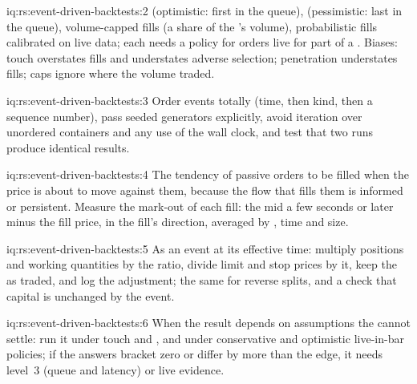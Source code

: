 \begin{solution}{iq:rs:event-driven-backtests:2}
 (optimistic: first in the queue),  (pessimistic: last in the queue), volume-capped fills (a share of the 's volume),
probabilistic fills calibrated on live data; each needs a policy for orders live for part of a . Biases: touch overstates fills and understates adverse
selection; penetration understates fills; caps ignore where the volume traded.
\end{solution}

\begin{solution}{iq:rs:event-driven-backtests:3}
Order events totally (time, then kind, then a sequence number), pass seeded generators explicitly, avoid iteration over unordered containers and any use of the
wall clock, and test that two runs produce identical results.
\end{solution}

\begin{solution}{iq:rs:event-driven-backtests:4}
The tendency of passive orders to be filled when the price is about to move against them, because the flow that fills them is informed or persistent.
Measure the mark-out of each fill: the mid a few seconds or  later minus the fill price, in the fill's direction, averaged by , time and size.
\end{solution}

\begin{solution}{iq:rs:event-driven-backtests:5}
As an event at its effective time: multiply positions and working quantities by the ratio, divide limit and stop prices by it, keep the  as traded, and log
the adjustment; the same for reverse splits, and a check that capital is unchanged by the event.
\end{solution}

\begin{solution}{iq:rs:event-driven-backtests:6}
When the result depends on assumptions the  cannot settle: run it under touch and , and under conservative and optimistic live-in-bar
policies; if the answers bracket zero or differ by more than the edge, it needs level~3 (queue and latency) or live evidence.
\end{solution}
